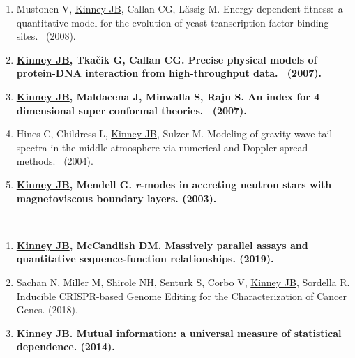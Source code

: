 \documentclass[10pt,hidelinks]{article}
\begin{document}
\begin{enumerate}
\item Mustonen V, \underline{Kinney JB}, Callan CG, L\"{a}ssig M. Energy-dependent fitness:\ a quantitative model for the evolution of yeast transcription factor binding sites.\  (2008).

\item \textbf{\underline{Kinney JB}, Tka\v{c}ik G, Callan CG. Precise physical models of protein-DNA interaction from high-throughput data.\  (2007).}

\item \textbf{\underline{Kinney JB}, Maldacena J, Minwalla S, Raju S. An index for 4 dimensional super conformal theories.\  (2007).}

\item Hines C, Childress L, \underline{Kinney JB}, Sulzer M. Modeling of gravity-wave tail spectra in the middle atmosphere via numerical and Doppler-spread methods.\  (2004).

\item \textbf{\underline{Kinney JB}, Mendell G. \emph{r}-modes in accreting neutron stars with magnetoviscous boundary layers.  (2003).}
\end{enumerate}
\,\\

\begin{enumerate}
\item \textbf{\underline{Kinney JB}, McCandlish DM. Massively parallel assays and quantitative sequence-function relationships.  (2019).}

\item Sachan N, Miller M, Shirole NH, Senturk S, Corbo V, \underline{Kinney JB}, Sordella R. Inducible CRISPR-based Genome Editing for the Characterization of Cancer Genes.  (2018).

\item \textbf{\underline{Kinney JB}. Mutual information: a universal measure of statistical dependence.  (2014).}
\end{enumerate}
\,\\
\end{document}
